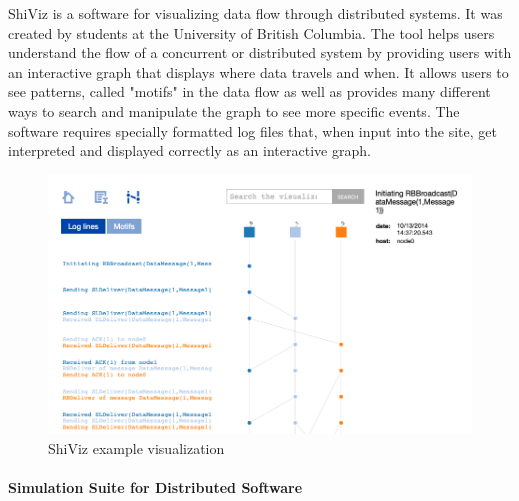 \documentclass[12pt, oneside]{article}   	%
\begin{document}
ShiViz is a software for visualizing data flow through distributed systems.  It was created by students at the University of British Columbia.  The tool helps users understand the flow of a concurrent or distributed system by providing users with an interactive graph that displays where data travels and when.  It allows users to see patterns, called "motifs" in the data flow as well as provides many different ways to search and manipulate the graph to see more specific events.  The software requires specially formatted log files that, when input into the site, get interpreted and displayed correctly as an interactive graph.
\begin{figure}[h!]
\caption{ShiViz example visualization}
\includegraphics[scale=0.4]{ShiViz_Example.png} 
\centering
\end{figure}


\paragraph{Simulation Suite for Distributed Software}
\end{document}
